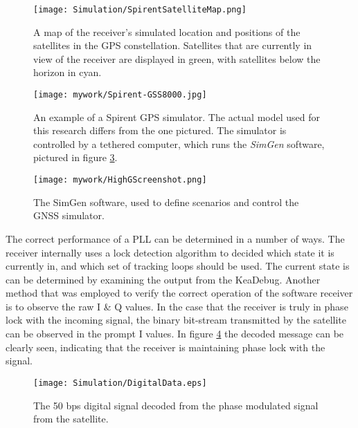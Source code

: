 \begin{figure}[!htb] 
    \centering
    \texttt{[image: Simulation/SpirentSatelliteMap.png]} 
    \caption{A map of the receiver's simulated location and positions of the satellites in the GPS constellation. Satellites that are currently in view of the receiver are displayed in green, with satellites below the horizon in cyan.}
    \label{fig:SpirentSatelliteMap}
\end{figure}



\begin{figure}[!htb] 
    \centering
    \texttt{[image: mywork/Spirent-GSS8000.jpg]} 
    \caption{An example of a Spirent \ac{GPS} simulator. The actual model used for this research differs from the one pictured. The simulator is controlled by a tethered computer, which runs the \emph{SimGen} software, pictured in figure \ref{:HighGScreenshot}.}
    \label{fig:Spirent}
\end{figure}

\begin{figure}[!htb] 
    \centering
    \texttt{[image: mywork/HighGScreenshot.png]} 
    \caption{The SimGen software, used to define scenarios and control the \ac{GNSS} simulator.}
    \label{:HighGScreenshot}
\end{figure}


The correct performance of a \ac{PLL} can be determined in a number of ways. The receiver internally uses a lock detection algorithm to decided which state it is currently in, and which set of tracking loops should be used. The current state is can be determined by examining the output from the KeaDebug. Another method that was employed to verify the correct operation of the software receiver is to observe the raw I \& Q values. In the case that the receiver is truly in phase lock with the incoming signal, the binary bit-stream transmitted by the satellite can be observed in the prompt I values. In figure \ref{fig:DigitalData} the decoded message can be clearly seen, indicating that the receiver is maintaining phase lock with the signal. 

\begin{figure}[!htb] 
    \centering
    \texttt{[image: Simulation/DigitalData.eps]} 
    \caption{The 50 bps digital signal decoded from the phase modulated signal from the satellite.}
    \label{fig:DigitalData}
\end{figure}

